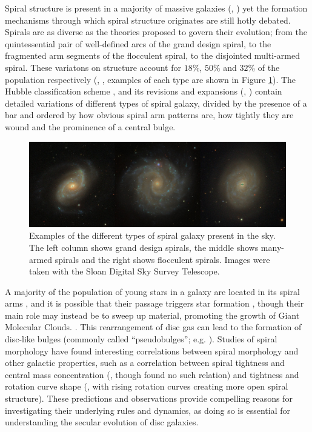 
Spiral structure is present in a majority of massive galaxies (\citealt{1989gadv.book..151B}, \citealt{2008MNRAS.389.1179L}) yet the formation mechanisms through which spiral structure originates are still hotly debated. Spirals are as diverse as the theories proposed to govern their evolution; from the quintessential pair of well-defined arcs of the grand design spiral, to the fragmented arm segments of the flocculent spiral, to the disjointed multi-armed spiral. These variatons on structure account for $18\%$, $50\%$ and $32\%$ of the population respectively (\citealt{2011ApJ...737...32E}, \citealt{2015yCat..22170032B}, examples of each type are shown in Figure \ref{fig:spiral-galaxy-types}). The Hubble classification scheme \citep{1926ApJ....64..321H}, and its revisions and expansions (\citealt{1961hag..book.....S}, \citealt{1991rc3..book.....D}) contain detailed variations of different types of spiral galaxy, divided by the presence of a bar and ordered by how obvious spiral arm patterns are, how tightly they are wound and the prominence of a central bulge.

\begin{figure}
  \includegraphics[width=13cm]{plots/galaxy_types.jpg}
  \caption{Examples of the different types of spiral galaxy present in the sky. The left column shows grand design spirals, the middle shows many-armed spirals and the right shows flocculent spirals. Images were taken with the Sloan Digital Sky Survey Telescope.}
  \label{fig:spiral-galaxy-types}
\end{figure}

A majority of the population of young stars in a galaxy are located in its spiral arms \citep{2011EAS....51...19E}, and it is possible that their passage triggers star formation \citep{2013A&A...560A..59C}, though their main role may instead be to sweep up material, promoting the growth of Giant Molecular Clouds. \citep{2014IAUS..298..221D}. This rearrangement of disc gas can lead to the formation of disc-like bulges (commonly called ``pseudobulges''; e.g. \citealt{2004ARA&A..42..603K}). Studies of spiral morphology have found interesting correlations between spiral morphology and other galactic properties, such as a correlation between spiral tightness and central mass concentration (\citealt{2019ApJ...871..194Y}, though \citealt{2017MNRAS.472.2263H} found no such relation) and tightness and rotation curve shape (\citealt{2005MNRAS.359.1065S}, with rising rotation curves creating more open spiral structure). These predictions and observations provide compelling reasons for investigating their underlying rules and dynamics, as doing so is essential for understanding the secular evolution of disc galaxies.

